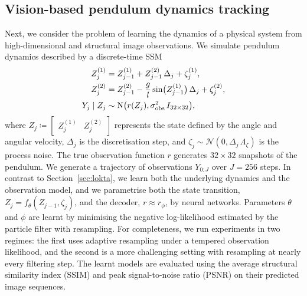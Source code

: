 \documentclass{article}
\begin{document}
\subsection{Vision-based pendulum dynamics tracking}
\label{sec:real-experiment}
Next, we consider the problem of learning the dynamics of a physical system from high-dimensional and structural image observations. 
We simulate pendulum dynamics described by a discrete-time SSM 
%
\begin{equation}
    \begin{split}
    Z^{(1)}_j &= Z^{(1)}_{j-1} + Z^{(2)}_{j-1} \, \Delta_j + \zeta_j^{(1)}, \\
    Z^{(2)}_j &= Z^{(2)}_{j-1} - \frac{g}{l} \sin\bigl(Z^{(1)}_{j-1} \bigr) \, \Delta_j + \zeta_j^{(2)}, \\
    Y_j {\;|\;} Z_j &\sim \mathrm{N}\bigl(r(Z_j), \sigma_{\text{obs}}^2 \, I_{32\times 32}\bigr),
    \end{split}
    \label{eq:pendulum_dynamics}
\end{equation}
%
where $Z_j \coloneqq \begin{bmatrix} Z^{(1)}_j & Z^{(2)}_j \end{bmatrix}$ represents the state defined by the angle and angular velocity, $\Delta_j$ is the discretisation step, and $\zeta_j \sim \mathcal{N}(0, \Delta_j \, \Lambda_{\zeta})$ is the process noise. 
The true observation function $r$ generates $32 \times 32$ snapshots of the pendulum. 
We generate a trajectory of observations $Y_{0:J}$ over $J=256$ steps. 
In contrast to Section~\ref{sec:lokta}, we learn both the underlying dynamics and the observation model, and we parametrise both the state transition, $Z_j = f_\theta(Z_{j-1}, \zeta_{j})$, and the decoder, $r \approx r_\phi$, by neural networks. 
Parameters $\theta$ and $\phi$ are learnt by minimising the negative log-likelihood estimated by the particle filter with resampling. 
For completeness, we run experiments in two regimes: the first uses adaptive resampling under a tempered observation likelihood, and the second is a more challenging setting with resampling at nearly every filtering step. 
The learnt models are evaluated using the average structural similarity index (SSIM) and peak
signal-to-noise ratio (PSNR) on their predicted image sequences. 
\end{document}
